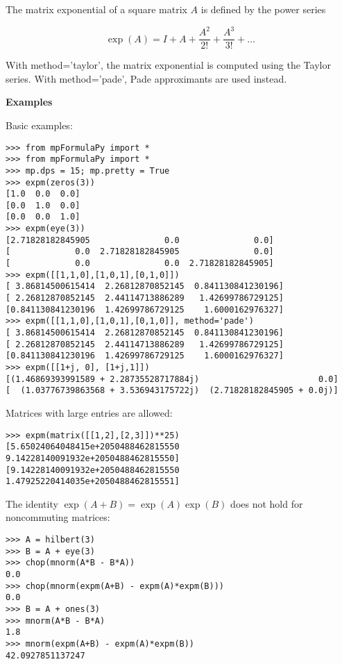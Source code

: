 \vpara
The matrix exponential of a square matrix $A$ is defined by the power series

\begin{equation}
\exp(A) = I + A + \frac{A^2}{2!}+ \frac{A^3}{3!} + \ldots
\end{equation}

With method='taylor', the matrix exponential is computed using the Taylor series. With method='pade', Pade approximants are used instead.

\vpara
\textbf{Examples}

Basic examples:

\begin{lstlisting}
>>> from mpFormulaPy import *
>>> from mpFormulaPy import *
>>> mp.dps = 15; mp.pretty = True
>>> expm(zeros(3))
[1.0  0.0  0.0]
[0.0  1.0  0.0]
[0.0  0.0  1.0]
>>> expm(eye(3))
[2.71828182845905               0.0               0.0]
[             0.0  2.71828182845905               0.0]
[             0.0               0.0  2.71828182845905]
>>> expm([[1,1,0],[1,0,1],[0,1,0]])
[ 3.86814500615414  2.26812870852145  0.841130841230196]
[ 2.26812870852145  2.44114713886289   1.42699786729125]
[0.841130841230196  1.42699786729125    1.6000162976327]
>>> expm([[1,1,0],[1,0,1],[0,1,0]], method='pade')
[ 3.86814500615414  2.26812870852145  0.841130841230196]
[ 2.26812870852145  2.44114713886289   1.42699786729125]
[0.841130841230196  1.42699786729125    1.6000162976327]
>>> expm([[1+j, 0], [1+j,1]])
[(1.46869393991589 + 2.28735528717884j)                        0.0]
[  (1.03776739863568 + 3.536943175722j)  (2.71828182845905 + 0.0j)]
\end{lstlisting}

Matrices with large entries are allowed:

\begin{lstlisting}
>>> expm(matrix([[1,2],[2,3]])**25)
[5.65024064048415e+2050488462815550  9.14228140091932e+2050488462815550]
[9.14228140091932e+2050488462815550  1.47925220414035e+2050488462815551]
\end{lstlisting}

The identity $\exp(A+B) = \exp(A) \exp(B)$ does not hold for noncommuting matrices:

\begin{lstlisting}
>>> A = hilbert(3)
>>> B = A + eye(3)
>>> chop(mnorm(A*B - B*A))
0.0
>>> chop(mnorm(expm(A+B) - expm(A)*expm(B)))
0.0
>>> B = A + ones(3)
>>> mnorm(A*B - B*A)
1.8
>>> mnorm(expm(A+B) - expm(A)*expm(B))
42.0927851137247
\end{lstlisting}


